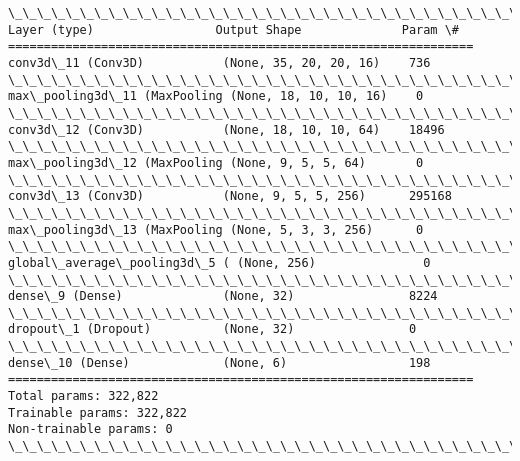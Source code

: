 \documentclass[11pt]{article}
\begin{document}
    \begin{Verbatim}[commandchars=\\\{\}]
\_\_\_\_\_\_\_\_\_\_\_\_\_\_\_\_\_\_\_\_\_\_\_\_\_\_\_\_\_\_\_\_\_\_\_\_\_\_\_\_\_\_\_\_\_\_\_\_\_\_\_\_\_\_\_\_\_\_\_\_\_\_\_\_\_
Layer (type)                 Output Shape              Param \#   
=================================================================
conv3d\_11 (Conv3D)           (None, 35, 20, 20, 16)    736       
\_\_\_\_\_\_\_\_\_\_\_\_\_\_\_\_\_\_\_\_\_\_\_\_\_\_\_\_\_\_\_\_\_\_\_\_\_\_\_\_\_\_\_\_\_\_\_\_\_\_\_\_\_\_\_\_\_\_\_\_\_\_\_\_\_
max\_pooling3d\_11 (MaxPooling (None, 18, 10, 10, 16)    0         
\_\_\_\_\_\_\_\_\_\_\_\_\_\_\_\_\_\_\_\_\_\_\_\_\_\_\_\_\_\_\_\_\_\_\_\_\_\_\_\_\_\_\_\_\_\_\_\_\_\_\_\_\_\_\_\_\_\_\_\_\_\_\_\_\_
conv3d\_12 (Conv3D)           (None, 18, 10, 10, 64)    18496     
\_\_\_\_\_\_\_\_\_\_\_\_\_\_\_\_\_\_\_\_\_\_\_\_\_\_\_\_\_\_\_\_\_\_\_\_\_\_\_\_\_\_\_\_\_\_\_\_\_\_\_\_\_\_\_\_\_\_\_\_\_\_\_\_\_
max\_pooling3d\_12 (MaxPooling (None, 9, 5, 5, 64)       0         
\_\_\_\_\_\_\_\_\_\_\_\_\_\_\_\_\_\_\_\_\_\_\_\_\_\_\_\_\_\_\_\_\_\_\_\_\_\_\_\_\_\_\_\_\_\_\_\_\_\_\_\_\_\_\_\_\_\_\_\_\_\_\_\_\_
conv3d\_13 (Conv3D)           (None, 9, 5, 5, 256)      295168    
\_\_\_\_\_\_\_\_\_\_\_\_\_\_\_\_\_\_\_\_\_\_\_\_\_\_\_\_\_\_\_\_\_\_\_\_\_\_\_\_\_\_\_\_\_\_\_\_\_\_\_\_\_\_\_\_\_\_\_\_\_\_\_\_\_
max\_pooling3d\_13 (MaxPooling (None, 5, 3, 3, 256)      0         
\_\_\_\_\_\_\_\_\_\_\_\_\_\_\_\_\_\_\_\_\_\_\_\_\_\_\_\_\_\_\_\_\_\_\_\_\_\_\_\_\_\_\_\_\_\_\_\_\_\_\_\_\_\_\_\_\_\_\_\_\_\_\_\_\_
global\_average\_pooling3d\_5 ( (None, 256)               0         
\_\_\_\_\_\_\_\_\_\_\_\_\_\_\_\_\_\_\_\_\_\_\_\_\_\_\_\_\_\_\_\_\_\_\_\_\_\_\_\_\_\_\_\_\_\_\_\_\_\_\_\_\_\_\_\_\_\_\_\_\_\_\_\_\_
dense\_9 (Dense)              (None, 32)                8224      
\_\_\_\_\_\_\_\_\_\_\_\_\_\_\_\_\_\_\_\_\_\_\_\_\_\_\_\_\_\_\_\_\_\_\_\_\_\_\_\_\_\_\_\_\_\_\_\_\_\_\_\_\_\_\_\_\_\_\_\_\_\_\_\_\_
dropout\_1 (Dropout)          (None, 32)                0         
\_\_\_\_\_\_\_\_\_\_\_\_\_\_\_\_\_\_\_\_\_\_\_\_\_\_\_\_\_\_\_\_\_\_\_\_\_\_\_\_\_\_\_\_\_\_\_\_\_\_\_\_\_\_\_\_\_\_\_\_\_\_\_\_\_
dense\_10 (Dense)             (None, 6)                 198       
=================================================================
Total params: 322,822
Trainable params: 322,822
Non-trainable params: 0
\_\_\_\_\_\_\_\_\_\_\_\_\_\_\_\_\_\_\_\_\_\_\_\_\_\_\_\_\_\_\_\_\_\_\_\_\_\_\_\_\_\_\_\_\_\_\_\_\_\_\_\_\_\_\_\_\_\_\_\_\_\_\_\_\_

    \end{Verbatim}
\end{document}
